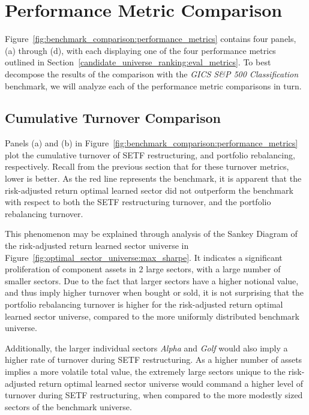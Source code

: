 \documentclass[../main.tex]{subfiles}
\begin{document}
\section{Performance Metric Comparison}

Figure~\ref{fig:benchmark_comparison:performance_metrics} contains four panels, (a) through (d), with each displaying one of the four performance metrics outlined in Section~\ref{candidate_universe_ranking:eval_metrics}. To best decompose the results of the comparison with the \textit{GICS S\&P 500 Classification} benchmark, we will analyze each of the performance metric comparisons in turn.

\subsection{Cumulative Turnover Comparison}

Panels (a) and (b) in Figure~\ref{fig:benchmark_comparison:performance_metrics} plot the cumulative turnover of SETF restructuring, and portfolio rebalancing, respectively. Recall from the previous section that for these turnover metrics, lower is better. As the red line represents the benchmark, it is apparent that the risk-adjusted return optimal learned sector did not outperform the benchmark with respect to both the SETF restructuring turnover, and the portfolio rebalancing turnover.

\pagebreak

This phenomenon may be explained through analysis of the Sankey Diagram of the risk-adjusted return learned sector universe in Figure~\ref{fig:optimal_sector_universe:max_sharpe}. It indicates a significant proliferation of component assets in 2 large sectors, with a large number of smaller sectors. Due to the fact that larger sectors have a higher notional value, and thus imply higher turnover when bought or sold, it is not surprising that the portfolio rebalancing turnover is higher for the risk-adjusted return optimal learned sector universe, compared to the more uniformly distributed benchmark universe.

Additionally, the larger individual sectors \textit{Alpha} and \textit{Golf} would also imply a higher rate of turnover during SETF restructuring. As a higher number of assets implies a more volatile total value, the extremely large sectors unique to the risk-adjusted return optimal learned sector universe would command a higher level of turnover during SETF restructuring, when compared to the more modestly sized sectors of the benchmark universe.
\end{document}
